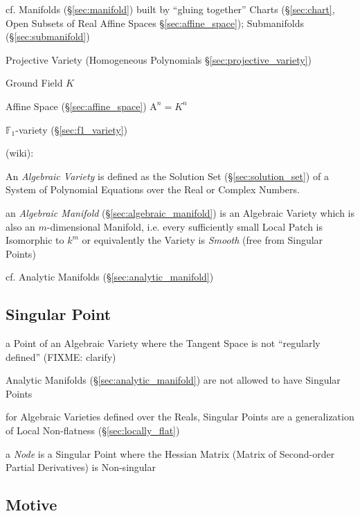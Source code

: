 cf. Manifolds (\S\ref{sec:manifold}) built by ``gluing together'' Charts
(\S\ref{sec:chart}, Open Subsets of Real Affine Spaces
\S\ref{sec:affine_space}); Submanifolds (\S\ref{sec:submanifold})

\fist Projective Variety (Homogeneous Polynomials
\S\ref{sec:projective_variety})

Ground Field $K$

Affine Space (\S\ref{sec:affine_space}) $\mathrm{A}^n = K^n$

\fist $\mathbb{F}_1$-variety (\S\ref{sec:f1_variety})


(wiki):

An \emph{Algebraic Variety} is defined as the Solution Set
(\S\ref{sec:solution_set}) of a System of Polynomial Equations over the Real or
Complex Numbers.

\fist an \emph{Algebraic Manifold} (\S\ref{sec:algebraic_manifold}) is an
Algebraic Variety which is also an $m$-dimensional Manifold, i.e. every
sufficiently small Local Patch is Isomorphic to $k^m$ or equivalently the
Variety is \emph{Smooth} (free from Singular Points)

cf. Analytic Manifolds (\S\ref{sec:analytic_manifold})



\subsection{Singular Point}\label{sec:singular_point}

a Point of an Algebraic Variety where the Tangent Space is not ``regularly
defined'' (FIXME: clarify)

Analytic Manifolds (\S\ref{sec:analytic_manifold}) are not allowed to have
Singular Points

for Algebraic Varieties defined over the Reals, Singular Points are a
generalization of Local Non-flatness (\S\ref{sec:locally_flat})

a \emph{Node} is a Singular Point where the Hessian Matrix (Matrix of
Second-order Partial Derivatives) is Non-singular



\subsection{Motive}\label{sec:motive}

